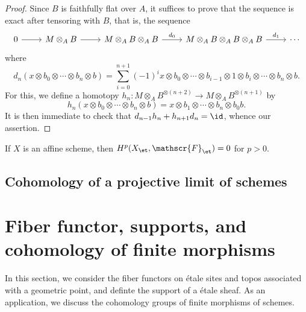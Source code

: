 \begin{proof}
Since $B$ is faithfully flat over $A$, it suffices to prove that the sequence is exact after tensoring with $B$, that is, the sequence
\[\begin{tikzcd}
0\ar[r]&M\otimes_AB\ar[r]&M\otimes_AB\otimes_AB\ar[r,"d_0"]&M\otimes_AB\otimes_AB\otimes_AB\ar[r,"d_1"]&\cdots
\end{tikzcd}\]
where
\[d_n(x\otimes b_0\otimes\cdots\otimes b_n\otimes b)=\sum_{i=0}^{n+1}(-1)^ix\otimes b_0\otimes\cdots\otimes b_{i-1}\otimes 1\otimes b_i\otimes\cdots\otimes b_n\otimes b.\]
For this, we define a homotopy $h_n:M\otimes_AB^{\otimes(n+2)}\to M\otimes_AB^{\otimes(n+1)}$ by
\[h_n(x\otimes b_0\otimes\cdots\otimes b_n\otimes b)=x\otimes b_1\otimes\cdots\otimes b_n\otimes b_0b.\]
It is then immediate to check that $d_{n-1}h_n+h_{n+1}d_n=\id$, whence our assertion.
\end{proof}

\begin{corollary}\label{scheme affine cohomology X_et qcoh zero}
If $X$ is an affine scheme, then $H^p(X_\et,\mathscr{F}_\et)=0$ for $p>0$.
\end{corollary}

\subsection{Cohomology of a projective limit of schemes}

\section{Fiber functor, supports, and cohomology of finite morphisms}
In this section, we consider the fiber functors on \'etale sites and topos associated with a geometric point, and definte the support of a \'etale sheaf. As an application, we discuss the cohomology groups of finite morphisms of schemes.

